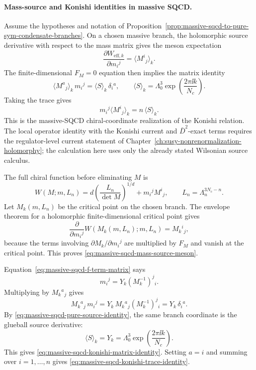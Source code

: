 \paragraph{Mass-source and Konishi identities in massive SQCD.}
\label{par:massive-sqcd-konishi-source-identities}
Assume the hypotheses and notation of
Proposition~\ref{prop:massive-sqcd-to-pure-sym-condensate-branches}.  On a
chosen massive branch, the holomorphic source derivative with respect to the
mass matrix gives the meson expectation
\begin{equation}
  \frac{\partial W_{\mathrm{eff},k}}{\partial m_i{}^j}
  =
  \langle M^i{}_j\rangle_k .
  \label{eq:massive-sqcd-mass-source-meson}
\end{equation}
The finite-dimensional \(F_M=0\) equation then implies the matrix identity
\begin{equation}
  \langle M^a{}_j\rangle_k\,m_i{}^j
  =
  \langle S\rangle_k\,\delta_i{}^a,
  \qquad
  \langle S\rangle_k
  =
  \Lambda_0^3\exp\!\left(\frac{2\pi\ii k}{N_c}\right).
  \label{eq:massive-sqcd-konishi-matrix-identity}
\end{equation}
Taking the trace gives
\begin{equation}
  m_i{}^j\langle M^i{}_j\rangle_k
  =
  n\,\langle S\rangle_k .
  \label{eq:massive-sqcd-konishi-trace-identity}
\end{equation}
This is the massive-SQCD chiral-coordinate realization of the Konishi
relation.  The local operator identity with the Konishi current and
\(\bar D^2\)-exact terms requires the regulator-level current statement of
Chapter~\ref{ch:susy-nonrenormalization-holomorphy}; the calculation here
uses only the already stated Wilsonian source calculus.

The full chiral function before eliminating \(M\) is
\[
  W(M;m,L_n)
  =
  d\left(\frac{L_n}{\det M}\right)^{1/d}
  +m_i{}^jM^i{}_j,
  \qquad L_n=\Lambda_n^{3N_c-n}.
\]
Let \(M_k(m,L_n)\) be the critical point on the chosen branch.  The
envelope theorem for a holomorphic finite-dimensional critical point gives
\[
  \frac{\partial}{\partial m_i{}^j}
  W(M_k(m,L_n);m,L_n)
  =
  M_k{}^i{}_j ,
\]
because the terms involving
\(\partial M_k/\partial m_i{}^j\) are multiplied by \(F_M\) and vanish at
the critical point.  This proves
\eqref{eq:massive-sqcd-mass-source-meson}.

Equation~\eqref{eq:massive-sqcd-f-term-matrix} says
\[
  m_i{}^j=Y_k(M_k^{-1})^j{}_i .
\]
Multiplying by \(M_k{}^a{}_j\) gives
\[
  M_k{}^a{}_j\,m_i{}^j
  =
  Y_k\,M_k{}^a{}_j(M_k^{-1})^j{}_i
  =
  Y_k\,\delta_i{}^a .
\]
By
\eqref{eq:massive-sqcd-pure-source-identity}, the same branch coordinate is
the glueball source derivative:
\[
  \langle S\rangle_k=Y_k
  =
  \Lambda_0^3\exp\!\left(\frac{2\pi\ii k}{N_c}\right).
\]
This gives \eqref{eq:massive-sqcd-konishi-matrix-identity}.  Setting
\(a=i\) and summing over \(i=1,\ldots,n\) gives
\eqref{eq:massive-sqcd-konishi-trace-identity}.

